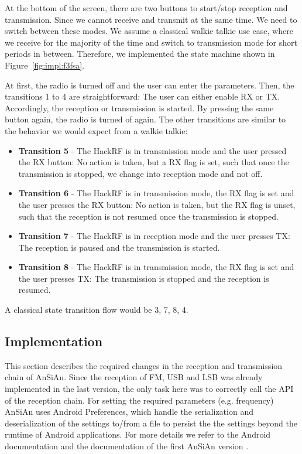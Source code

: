 At the bottom of the screen, there are two buttons to start/stop reception and transmission. Since we cannot receive and transmit at the same time. We need to switch between these modes. We assume a classical walkie talkie use case, where we receive for the majority of the time and switch to transmission mode for short periods in between. Therefore, we implemented the state machine shown in Figure~\ref{fig:impl:f3fsa}. 

At first, the radio is turned off and the user can enter the parameters. Then, the transitions 1 to 4 are straightforward:  The user can either enable RX or TX. Accordingly, the reception or transmission is started. By pressing the same button again, the radio is turned of again. The other transitions are similar to the behavior we would expect from a walkie talkie: 
\begin{itemize}
	\item \textbf{Transition 5} - The HackRF is in transmission mode and the user pressed the RX button: No action is taken, but a RX flag is set, such that once the transmission is stopped, we change into reception mode and not off. 
	\item \textbf{Transition 6} - The HackRF is in transmission mode, the RX flag is set and the user presses the RX button: No action is taken, but the RX flag is unset, such that the reception is not resumed once the transmission is stopped. 
	\item \textbf{Transition 7} - The HackRF is in reception mode and the user presses TX: The reception is paused and the transmission is started. 
	\item \textbf{Transition 8} - The HackRF is in transmission mode, the RX flag is set and the user presses TX: The transmission is stopped and the reception is resumed. 
\end{itemize}

A classical state transition flow would be 3, 7, 8, 4. 
\subsection{Implementation}

This section describes the required changes in the reception and transmission chain of AnSiAn. 
Since the reception of FM, USB and LSB was already implemented in the last version, the only task here was to correctly call the API of the reception chain. For setting the required parameters (e.g. frequency) AnSiAn uses Android Preferences, which handle the serialization and deserialization of the settings to/from a file to persist the the settings beyond the runtime of Android applications. For more details we refer to the Android documentation \cite{androidpref} and the documentation of the first AnSiAn version \cite{Kreis2015}.

